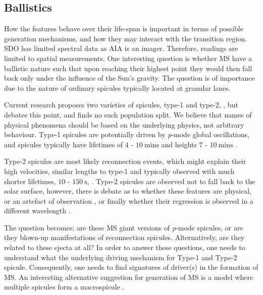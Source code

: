 \subsection{Ballistics}
How the features behave over their life-span is important in terms of possible generation mechanisms, and how they may interact with the transition region. SDO has limited spectral data as AIA is an imager. Therefore, readings are limited to spatial measurements. One interesting question is whether MS have a ballistic nature such that upon reaching their highest point they would then fall back only under the influence of the Sun's gravity. The question is of importance due to the nature of ordinary spicules typically located at granular lanes.

Current research proposes two varieties of spicules, type-1 and type-2, \cite{Pereira2012}, but \cite{Zhang2012} debates this point, and finds no such population split. We believe that names of physical phenomena should be based on the underlying physics, not arbitrary behaviour. Type-1 spicules are potentially driven by \emph{p}-mode global oscillations, and spicules typically have lifetimes of $4$ - $10\ \textrm{mins}$ and heights $7$ - $10\ \textrm{mins}$ \cite{DePointeu2004}.

Type-2 spicules are most likely reconnection events, which might explain their high velocities, similar lengths to type-1 and typically observed with much shorter lifetimes, $10$ - $150\ \textrm{s}$, \cite{Isobe2008}. Type-2 spicules are observed not to fall back to the solar surface, however, there is debate as to whether these features are physical, or an artefact of observation \cite{Tsiropoula2012}, \cite{Sekse2013} or finally whether their regression is observed in a different wavelength \cite{Pereira2014}.

The question becomes: are these MS giant versions of \emph{p}-mode spicules, or are they blown-up manifestations of reconnection spicules. Alternatively, are they related to these ejecta at all? In order to answer these questions, one needs to understand what the underlying driving mechanism for Type-1 and Type-2 spicule. Consequently, one needs to find signatures of driver(s) in the formation of MS. An interesting alternative suggestion for generation of MS is a model where multiple spicules form a macrospicule \cite{Xia2005}.

